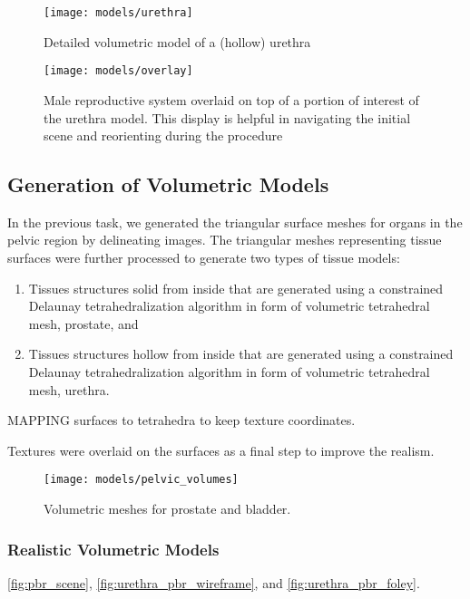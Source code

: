 \begin{figure}
  \centering%
  \texttt{[image: models/urethra]}
  \caption{Detailed volumetric model of a (hollow) urethra}\label{fig:urethra}
\end{figure}

\begin{figure}
  \centering%
  \texttt{[image: models/overlay]}
  \caption{Male reproductive system overlaid on top of a portion of interest of the urethra model. This display is helpful in navigating the initial scene and reorienting during the procedure}\label{fig:overlay}
\end{figure}

\subsection{Generation of Volumetric Models}\label{ssec:generation_volume}

In the previous task, we generated the triangular surface meshes for organs in the pelvic region by delineating  images. The triangular meshes representing tissue surfaces were further processed to generate two types of tissue models:
\begin{enumerate}
  \item Tissues structures solid from inside that are generated using a constrained Delaunay tetrahedralization algorithm \cite{tetwild} in form of volumetric tetrahedral mesh, \eg prostate, and
  \item Tissues structures hollow from inside that are generated using a constrained Delaunay tetrahedralization algorithm \cite{tetwild} in form of volumetric tetrahedral mesh, \eg urethra.
\end{enumerate}

MAPPING surfaces to tetrahedra to keep texture coordinates.

Textures were overlaid on the surfaces as a final step to improve the realism.

\begin{figure}
  \centering%
  \texttt{[image: models/pelvic\_volumes]}
  \caption{Volumetric meshes for prostate and bladder.}\label{fig:organ_prostate_bladder_generation}
\end{figure}

\subsubsection{Realistic Volumetric Models}
\autoref{fig:pbr_scene}, \autoref{fig:urethra_pbr_wireframe}, and \autoref{fig:urethra_pbr_foley}.

